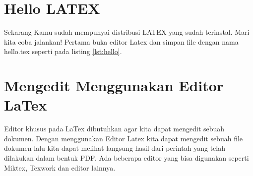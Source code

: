 \section{Hello LATEX}
Sekarang Kamu sudah mempunyai distribusi LATEX yang sudah terinstal. Mari kita coba jalankan! Pertama buka editor Latex dan simpan file dengan nama hello.tex seperti pada listing \ref{lst:hello}.
\cite{kline2018latex}

\section{Mengedit Menggunakan Editor LaTex}
Editor khusus pada LaTex dibutuhkan agar kita dapat mengedit sebuah dokumen. Dengan menggunakan Editor Latex kita dapat mengedit sebuah file dokumen lalu kita dapat melihat langsung hasil dari perintah yang telah dilakukan dalam bentuk PDF. Ada beberapa editor yang bisa digunakan seperti Miktex, Texwork dan editor lainnya.
